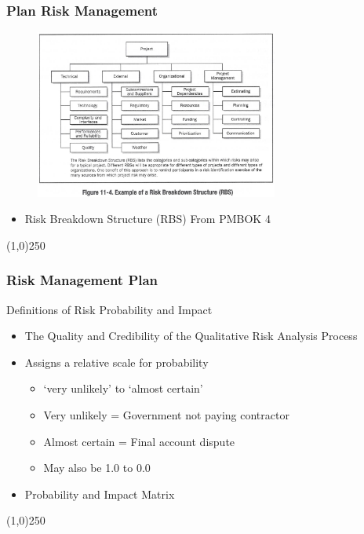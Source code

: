 \begin{frame}
\frametitle{Plan Risk Management}
\begin{figure}
	\centering
		\includegraphics[width = 8cm]{images/RBS.jpg}
	\label{fig:11-4OLD}
\end{figure}
\begin{itemize}
\item Risk Breakdown Structure (RBS) From PMBOK 4
\end{itemize}
\end{frame}\begin{center}\line(1,0){250}\end{center}






\begin{frame}
\frametitle{Risk Management Plan}
Definitions of Risk Probability and Impact
\begin{itemize}
	\item The Quality and Credibility of the Qualitative Risk Analysis Process
	\item Assigns a relative scale for probability

	\begin{itemize}
		\item `very unlikely' to `almost certain'
		\item Very unlikely = Government not paying contractor
		\item Almost certain = Final account dispute
		\item May also be 1.0 to 0.0
	\end{itemize}
	\item Probability and Impact Matrix
\end{itemize}
\end{frame}\begin{center}\line(1,0){250}\end{center}






